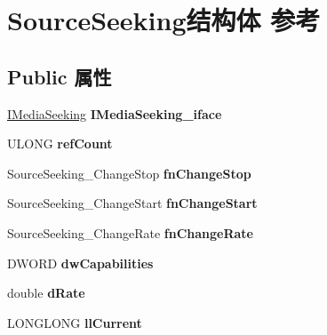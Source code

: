 \hypertarget{struct_source_seeking}{}\section{Source\+Seeking结构体 参考}
\label{struct_source_seeking}
\subsection*{Public 属性}
\begin{DoxyCompactItemize}
\item 
\mbox{\label{struct_source_seeking_af90120127417bc297b39783e2412b621}} 
\hyperlink{interface_i_media_seeking}{I\+Media\+Seeking} {\bfseries I\+Media\+Seeking\+\_\+iface}
\item 
\mbox{\label{struct_source_seeking_ad979805fbd5d0789d05a5eb3e01ee1f4}} 
U\+L\+O\+NG {\bfseries ref\+Count}
\item 
\mbox{\label{struct_source_seeking_af8a48a69fe6dc3469828a11a6244219d}} 
Source\+Seeking\+\_\+\+Change\+Stop {\bfseries fn\+Change\+Stop}
\item 
\mbox{\label{struct_source_seeking_aae6e32464f1618d93f0d4fee2979aa8a}} 
Source\+Seeking\+\_\+\+Change\+Start {\bfseries fn\+Change\+Start}
\item 
\mbox{\label{struct_source_seeking_a5b34defcad7db11c4363354a1b331932}} 
Source\+Seeking\+\_\+\+Change\+Rate {\bfseries fn\+Change\+Rate}
\item 
\mbox{\label{struct_source_seeking_a9d0901d1ca6b545ddcc488133cffc6bb}} 
D\+W\+O\+RD {\bfseries dw\+Capabilities}
\item 
\mbox{\label{struct_source_seeking_a50d14f2a093713251ea3bc54f733a46f}} 
double {\bfseries d\+Rate}
\item 
\mbox{\label{struct_source_seeking_a2fccbbf948218aff6893ad52570fb8aa}} 
L\+O\+N\+G\+L\+O\+NG {\bfseries ll\+Current}
\item 
\mbox{\label{struct_source_seeking_a4ab20400e48455de65cd41fe5417309a}} 

\end{DoxyCompactItemize}
